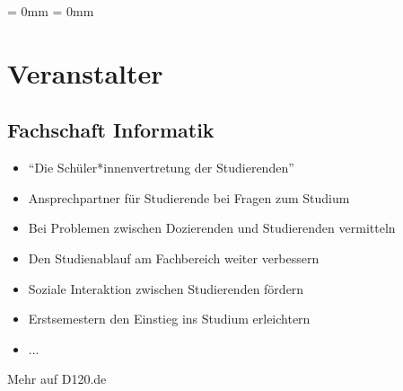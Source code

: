 

\usepackage{listings}
\usepackage{tikz}
\usepackage{tabularx,booktabs,multirow,multicol,colortbl}
\aboverulesep = 0mm \belowrulesep = 0mm

\def\streamlink{https://youtu.be/2V5YFfyPcr4}
\def\moodlecourselink{https://moodle.informatik.tu-darmstadt.de/course/view.php?id=1502}



\subtitle{Organisatorisches}
\maketitle

\section{Veranstalter}
\subsection*{Fachschaft Informatik}
\begin{frame}
    \slidehead
    \begin{itemize}
        \item "`Die Schüler*innenvertretung der Studierenden"'
        \item Ansprechpartner für Studierende bei Fragen zum Studium
        \item Bei Problemen zwischen Dozierenden und Studierenden vermitteln
        \item Den Studienablauf am Fachbereich weiter verbessern
        \item Soziale Interaktion zwischen Studierenden fördern
        \item Erstsemestern den Einstieg ins Studium erleichtern
        \item ...
    \end{itemize}
    \centering
    \vspace{3mm}
    \huge Mehr auf D120.de
\end{frame}

